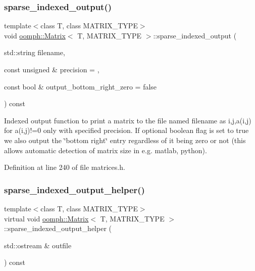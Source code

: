 \subsubsection{\texorpdfstring{sparse\+\_\+indexed\+\_\+output()}{sparse\_indexed\_output()}\hspace{0.1cm}{\footnotesize\ttfamily [2/2]}}
{\footnotesize\ttfamily template$<$class T, class M\+A\+T\+R\+I\+X\+\_\+\+T\+Y\+PE$>$ \\
void \hyperlink{classoomph_1_1Matrix}{oomph\+::\+Matrix}$<$ T, M\+A\+T\+R\+I\+X\+\_\+\+T\+Y\+PE $>$\+::sparse\+\_\+indexed\+\_\+output (\begin{DoxyParamCaption}\item[{std\+::string}]{filename,  }\item[{const unsigned \&}]{precision = {},  }\item[{const bool \&}]{output\+\_\+bottom\+\_\+right\+\_\+zero = {\ttfamily false} }\end{DoxyParamCaption}) const\hspace{0.3cm}{\ttfamily [inline]}}



Indexed output function to print a matrix to the file named filename as i,j,a(i,j) for a(i,j)!=0 only with specified precision. If optional boolean flag is set to true we also output the \char`\"{}bottom right\char`\"{} entry regardless of it being zero or not (this allows automatic detection of matrix size in e.\+g. matlab, python). 



Definition at line 240 of file matrices.\+h.

\mbox{\label{classoomph_1_1Matrix_a7a5b44e7688ce2c2f7552da104e615c8}} 
\subsubsection{\texorpdfstring{sparse\+\_\+indexed\+\_\+output\+\_\+helper()}{sparse\_indexed\_output\_helper()}}
{\footnotesize\ttfamily template$<$class T, class M\+A\+T\+R\+I\+X\+\_\+\+T\+Y\+PE$>$ \\
virtual void \hyperlink{classoomph_1_1Matrix}{oomph\+::\+Matrix}$<$ T, M\+A\+T\+R\+I\+X\+\_\+\+T\+Y\+PE $>$\+::sparse\+\_\+indexed\+\_\+output\+\_\+helper (\begin{DoxyParamCaption}\item[{std\+::ostream \&}]{outfile }\end{DoxyParamCaption}) const\hspace{0.3cm}{\ttfamily [pure virtual]}}



